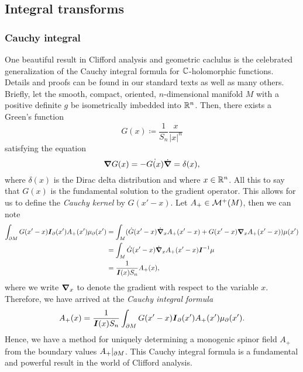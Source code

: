 \subsection{Integral transforms}
\label{subsec:integral_transforms}

\subsubsection{Cauchy integral}


One beautiful result in Clifford analysis and geometric caclulus is the celebrated generalization of the Cauchy integral formula for $\mathbb{C}$-holomorphic functions. Details and proofs can be found in our standard texts \cite{doran_geometric_2003,hestenes_clifford_1984} as well as many others. Briefly, let the smooth, compact, oriented, $n$-dimensional manifold $M$ with a positive definite $g$ be isometrically imbedded into $\mathbb{R}^n$. Then, there exists a Green's function
\begin{equation}
G(x)\coloneqq \frac{1}{S_n} \frac{x}{|x|^n}
\end{equation}
satisfying the equation
\begin{equation}
\label{eq:fundamental_solution}
\boldsymbol{\nabla} G(x) = -\dot{G(x)}\dot{\boldsymbol{\nabla}} = \delta(x),
\end{equation}
where $\delta(x)$ is the Dirac delta distribution and where $x\in \mathbb{R}^n$. All this to say that $G(x)$ is the fundamental solution to the gradient operator. This allows for us to define the \emph{Cauchy kernel} by $G(x'-x)$. Let $A_+ \in \mathcal{M}^{+}(M)$, then we can note
\begin{align}
\label{eq:integration_greens_function}
\int_{\partial M} G(x'-x) \boldsymbol{I}_\partial(x') A_+(x') \mu_\partial(x') &= \int_M (\dot{G}(x'-x)\dot{\boldsymbol{\nabla}}_x A_+(x'-x) + G(x'-x)\boldsymbol{\nabla}_x A_+(x'-x))\mu(x')\\
&= \int_M \dot{G}(x'-x)\dot{\boldsymbol{\nabla}}_xA_+(x'-x) \boldsymbol{I}^{-1} \mu \\
&= \frac{1}{\boldsymbol{I}(x) S_n} A_+(x),
\end{align}
where we write $\boldsymbol{\nabla}_x$ to denote the gradient with respect to the variable $x$. Therefore, we have arrived at the \emph{Cauchy integral formula}
\begin{equation}
\label{eq:cauchy_integral}
A_+(x) = \frac{1}{\boldsymbol{I}(x) S_n} \int_{\partial M} G(x'-x) \boldsymbol{I}_\partial(x') A_+(x') \mu_\partial(x').
\end{equation}
Hence, we have a method for uniquely determining a monogenic spinor field $A_+$ from the boundary values $A_+\vert_{\partial M}$. This Cauchy integral formula is a fundamental and powerful result in the world of Clifford analysis. 

